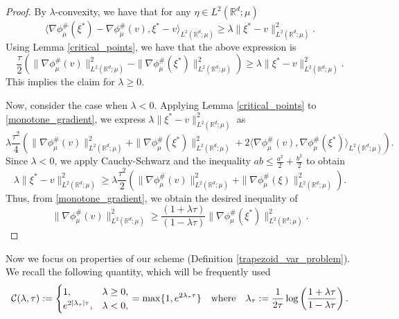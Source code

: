 \documentclass[11pt,a4paper]{amsart}
\newcommand{\1}{\mathds{1}}
\numberwithin{equation}{section}
\begin{document}
\begin{proof}
By $\lambda$-convexity, we have that for any $\eta \in L^2(\mathbb{R}^d;\mu)$
\[
\langle \nabla \phi^{\#}_{\mu}( \xi^*) - \nabla \phi^{\#}_{\mu}( v), \xi^* - v \rangle_{L^2(\mathbb{R}^d;\mu)} \geq \lambda \|\xi^* - v\|_{L^2(\mathbb{R}^d;\mu)}^2.
\]
Using Lemma \ref{critical_points}, we have that the above expression is
\begin{equation}
\frac{\tau}{2} \left( \|\nabla  \phi^{\#}_{\mu} (v)\|^2_{L^2(\mathbb{R}^d;\mu)} - \|\nabla \phi^{\#}_{\mu}(\xi^*) \|^2_{L^2(\mathbb{R}^d;\mu)} \right) \geq \lambda \|\xi^*-v\|^2_{L^2(\mathbb{R}^d;\mu)}.
\label{monotone_gradient}
\end{equation} \noindent This implies the claim for $\lambda \geq 0$. \smallskip


\noindent Now, consider the case when $\lambda < 0$. Applying Lemma \ref{critical_points} to \eqref{monotone_gradient}, we express $\lambda \|\xi^*-v\|^2_{L^2(\mathbb{R}^d;\mu)}$ as
\begin{equation}
\lambda \frac{\tau^2}{4} \left( \|\nabla \phi^{\#}_{\mu}(v)\|^2_{L^2(\mathbb{R}^d;\mu)} 
+ \|\nabla \phi^{\#}_{\mu}(\xi^*)\|^2_{L^2(\mathbb{R}^d;\mu)}
+ 2\langle \nabla \phi^{\#}_{\mu}(v), \nabla \phi^{\#}_{\mu}(\xi^*)  \rangle_{L^2(\mathbb{R}^d;\mu)}  
\right).
\label{squared_distance_equality}
\end{equation}
Since $\lambda < 0$, we apply Cauchy-Schwarz and the inequality $ab \leq \frac{a^2}{2}  + \frac{b^2}{2}$ to obtain
\begin{equation}
\lambda \|\xi^* - v\|^2_{L^2(\mathbb{R}^d;\mu)} \geq  \lambda \frac{\tau^2}{2} \left( \|\nabla \phi^{\#}_{\mu}(v)\|^2_{L^2(\mathbb{R}^d;\mu)}
+ \|\nabla \phi^{\#}_{\mu}(\xi)\|^2_{L^2(\mathbb{R}^d;\mu)} \right).
\end{equation}
Thus, from \eqref{monotone_gradient}, we obtain the desired inequality of
\[
\|\nabla\phi^{\#}_{\mu}(v)\|^2_{L^2(\mathbb{R}^d;\mu)} \geq  \frac{(1+\lambda \tau)}{(1-\lambda \tau)} \|\nabla  \phi^{\#}_{\mu}(\xi^*)\|^2_{L^2(\mathbb{R}^d;\mu)}.\] \end{proof}

Now we focus on properties of our scheme (Definition \ref{trapezoid_var_problem}). We recall the following quantity, which will be frequently used
\begin{equation}
\mathcal{C}(\lambda,\tau) :=
\begin{cases}
1, & \lambda \geq 0, \\
e^{2|\lambda_{\tau}| \tau}, & \lambda < 0,
\end{cases} = \max\{1,e^{2 \lambda_{\tau} \tau} \}
\quad \textnormal{where} \quad 
\lambda_{\tau} := \frac{1}{2\tau} \log \left( \frac{1+\lambda \tau}{1-\lambda \tau} \right).
\end{equation}
\end{document}
